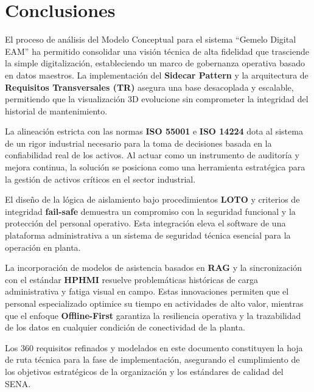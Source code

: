 \section{Conclusiones}

El proceso de análisis del Modelo Conceptual para el sistema ``Gemelo Digital EAM'' ha permitido consolidar una visión técnica de alta fidelidad que trasciende la simple digitalización, estableciendo un marco de gobernanza operativa basado en datos maestros. La implementación del \textbf{Sidecar Pattern} y la arquitectura de \textbf{Requisitos Transversales (TR)} asegura una base desacoplada y escalable, permitiendo que la visualización 3D evolucione sin comprometer la integridad del historial de mantenimiento.

La alineación estricta con las normas \textbf{ISO 55001} e \textbf{ISO 14224} dota al sistema de un rigor industrial necesario para la toma de decisiones basada en la confiabilidad real de los activos. Al actuar como un instrumento de auditoría y mejora continua, la solución se posiciona como una herramienta estratégica para la gestión de activos críticos en el sector industrial.

El diseño de la lógica de aislamiento bajo procedimientos \textbf{LOTO} y criterios de integridad \textbf{fail-safe} demuestra un compromiso con la seguridad funcional y la protección del personal operativo. Esta integración eleva el software de una plataforma administrativa a un sistema de seguridad técnica esencial para la operación en planta.

La incorporación de modelos de asistencia basados en \textbf{RAG} y la sincronización con el estándar \textbf{HPHMI} resuelve problemáticas históricas de carga administrativa y fatiga visual en campo. Estas innovaciones permiten que el personal especializado optimice su tiempo en actividades de alto valor, mientras que el enfoque \textbf{Offline-First} garantiza la resiliencia operativa y la trazabilidad de los datos en cualquier condición de conectividad de la planta.

Los 360 requisitos refinados y modelados en este documento constituyen la hoja de ruta técnica para la fase de implementación, asegurando el cumplimiento de los objetivos estratégicos de la organización y los estándares de calidad del SENA.
